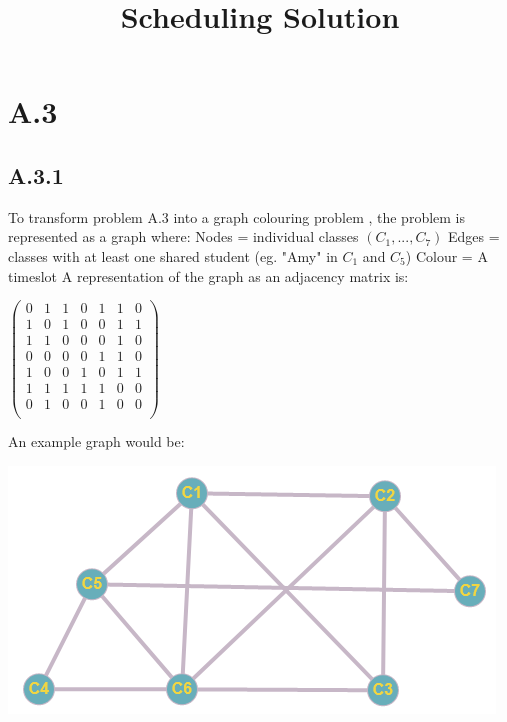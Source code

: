 \documentclass{article}
\title{Scheduling Solution }
\begin{document}
\maketitle
\newpage
\section*{A.3}
\subsection*{A.3.1}
To transform problem A.3 into a graph colouring problem , the problem is represented as a graph where:
\newline
Nodes = individual classes $(C_1,..., C_7)$
\newline
Edges = classes with at least one shared student (eg. "Amy" in $C_1$ and $C_5$)
\newline
Colour = A timeslot
\newline
A representation of the graph as an adjacency matrix is:
\newline
\begin{center}
$\begin{pmatrix}
   0&1&1&0&1&1&0\\
   1&0&1&0&0&1&1\\
   1&1&0&0&0&1&0\\
   0&0&0&0&1&1&0\\
   1&0&0&1&0&1&1\\
   1&1&1&1&1&0&0\\
   0&1&0&0&1&0&0\\
\end{pmatrix}$
\end{center}
An example graph would be:
\newline
\begin{center}
\includegraphics{a31NC}
\newline
\end{center}
\end{document}
